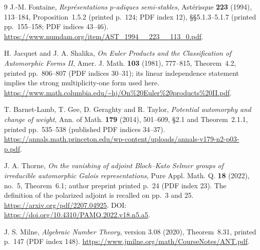 \begin{thebibliography}{9}
J.-M. Fontaine, \emph{Repr\'esentations $p$-adiques semi-stables},
Ast\'erisque \textbf{223} (1994), 113--184,
Proposition~1.5.2 (printed p.~124; PDF index 12),
\S\S5.1.3--5.1.7 (printed pp.~155--158; PDF indices 43--46).
\url{https://www.numdam.org/item/AST_1994__223__113_0.pdf}.

H. Jacquet and J. A. Shalika,
\emph{On Euler Products and the Classification of Automorphic Forms II},
Amer. J. Math. \textbf{103} (1981), 777--815, Theorem~4.2,
printed pp.~806--807 (PDF indices 30--31); its linear independence
statement implies the strong multiplicity-one form used here.
\url{https://www.math.columbia.edu/~hj/On%20Euler%20products%20II.pdf}.

T. Barnet-Lamb, T. Gee, D. Geraghty and R. Taylor,
\emph{Potential automorphy and change of weight},
Ann. of Math. \textbf{179} (2014), 501--609,
\S2.1 and Theorem~2.1.1, printed pp.~535--538
(published PDF indices 34--37).
\url{https://annals.math.princeton.edu/wp-content/uploads/annals-v179-n2-p03-p.pdf}.

J. A. Thorne, \emph{On the vanishing of adjoint Bloch--Kato Selmer
groups of irreducible automorphic Galois representations},
Pure Appl. Math. Q. \textbf{18} (2022), no.~5,
Theorem~6.1; author preprint printed p.~24 (PDF index 23).
The definition of the polarized adjoint is recalled on pp.~3 and 25.
\url{https://arxiv.org/pdf/2207.04925}.
DOI: \url{https://doi.org/10.4310/PAMQ.2022.v18.n5.a5}.

J. S. Milne, \emph{Algebraic Number Theory}, version 3.08 (2020),
Theorem~8.31, printed p.~147 (PDF index 148).
\url{https://www.jmilne.org/math/CourseNotes/ANT.pdf}.
\end{thebibliography}
